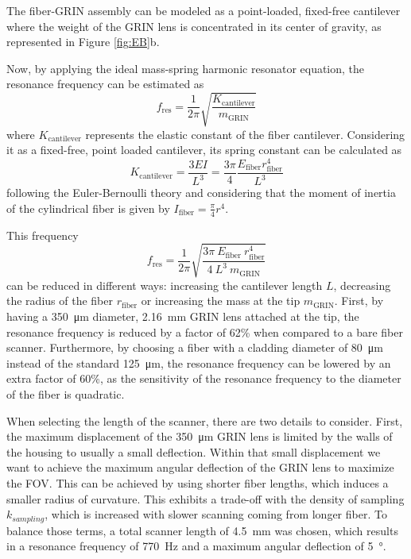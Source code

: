\documentclass[10pt]{iopart}
\begin{document}
The fiber-GRIN assembly can be modeled as a point-loaded, fixed-free cantilever where the weight of the GRIN lens is concentrated in its center of gravity, as represented in Figure \ref{fig:EB}b. 

Now, by applying the ideal mass-spring harmonic resonator equation, the resonance frequency can be estimated as 
\begin{equation}
f_\mathrm{res} = \frac{1}{2 \pi} \sqrt{\frac{K_\mathrm{cantilever}}{m_{\mathrm{GRIN}}}} 
\label{eq:fres}
\end{equation}
where $K_\mathrm{cantilever}$ represents the elastic constant of the fiber cantilever. Considering it as a fixed-free, point loaded cantilever, its spring constant can be calculated as 
\begin{equation}
K_\mathrm{cantilever} = \frac{3 E I}{L^3} = \frac{3 \pi}{4} \frac{E_\mathrm{fiber} r_\mathrm{fiber}^4}{L^3}
\label{eq:EB}
\end{equation}
following the Euler-Bernoulli theory \cite{MarcJ.Madou2011} and considering that the moment of inertia of the cylindrical fiber is given by $I_\mathrm{fiber} = \frac{\pi}{4} r^4$. 

This frequency 
\begin{equation}
f_\mathrm{res} = \frac{1}{2 \pi} \sqrt{\frac{3 \pi\ E_\mathrm{fiber}\ r_\mathrm{fiber}^4}{4\ L^3\ m_{\mathrm{GRIN}}}} 
\label{eq:fres}
\end{equation}
can be reduced in different ways: increasing the cantilever length $L$, decreasing the radius of the fiber $r_\mathrm{fiber}$ or increasing the mass at the tip $m_{\mathrm{GRIN}}$. First, by having a \SI{350}{\micro\meter} diameter, \SI{2.16}{\milli\meter} GRIN lens attached at the tip, the resonance frequency is reduced by a factor of 62\% when compared to a bare fiber scanner. Furthermore, by choosing a fiber with a cladding diameter of \SI{80}{\micro\meter} instead of the standard \SI{125}{\micro\meter}, the resonance frequency can be lowered by an extra factor of 60\%, as the sensitivity of the resonance frequency to the diameter of the fiber is quadratic. 

When selecting the length of the scanner, there are two details to consider. First, the maximum displacement of the \SI{350}{\micro\meter} GRIN lens is limited by the walls of the housing to usually a small deflection. Within that small displacement we want to achieve the maximum angular deflection of the GRIN lens to maximize the FOV. This can be achieved by using shorter fiber lengths, which induces a smaller radius of curvature. This exhibits a trade-off with the density of sampling $k_{sampling}$, which is increased with slower scanning coming from longer fiber. To balance those terms, a total scanner length of \SI{4.5}{\milli\meter} was chosen, which results in a resonance frequency of \SI{770}{\hertz} and a maximum angular deflection of \SI{5}{\degree}.
\end{document}
